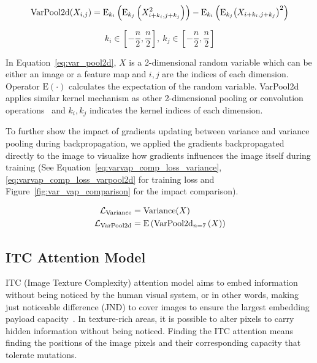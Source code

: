 \begin{equation}
  \mathrm{VarPool2d}(X_{i,j}) %
    = \E_{k_i} \left( \E_{k_j} \left( X_{i+k_i,j+k_j}^2 \right) \right) %
    - \E_{k_i} \left( \E_{k_j} {\left( X_{i+k_i,j+k_j} \right)}^2 \right)
  \label{eq:var_pool2d}
\end{equation}

\begin{equation*}%
  k_i \in \left[ -\frac{n}{2}, \frac{n}{2} \right],~ k_j \in \left[ -\frac{n}{2}, \frac{n}{2} \right]
  \label{eq:var_pool2d_cond}
\end{equation*}

In Equation~\ref{eq:var_pool2d}, \(X\) is a 2-dimensional random variable which can be either an image or a feature map and \(i, j\) are the indices of each dimension. Operator \(\mathrm{E}(\cdot)\) calculates the expectation of the random variable. VarPool2d applies similar kernel mechanism as other 2-dimensional pooling or convolution operations~\cite{MaxPooling,AlexNet} and \(k_i, k_j\) indicates the kernel indices of each dimension.

To further show the impact of gradients updating between variance and variance pooling during backpropagation, we applied the gradients backpropagated directly to the image to visualize how gradients influences the image itself during training (See Equation~\ref{eq:varvap_comp_loss_variance},\ref{eq:varvap_comp_loss_varpool2d} for training loss and Figure~\ref{fig:var_vap_comparison} for the impact comparison).

\begin{align}
    \mathcal{L}_\mathrm{Variance}  &= \mathrm{Variance}(X) \label{eq:varvap_comp_loss_variance} \\
    \mathcal{L}_\mathrm{VarPool2d} &= \mathrm{E} \left( \mathrm{VarPool2d}_{n=7} \left( X \right) \right) \label{eq:varvap_comp_loss_varpool2d}
\end{align}

\figureVarVapComparison%

\subsection{ITC Attention Model}%
\label{ssec:itc_model}

ITC (Image Texture Complexity) attention model aims to embed information without being noticed by the human visual system, or in other words, making just noticeable difference (JND) to cover images to ensure the largest embedding payload capacity~\cite{JND}. In texture-rich areas, it is possible to alter pixels to carry hidden information without being noticed. Finding the ITC attention means finding the positions of the image pixels and their corresponding capacity that tolerate mutations.


